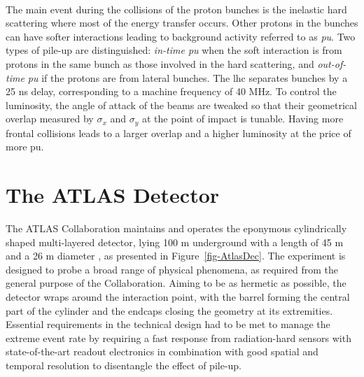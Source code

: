 \paragraph{}The main event during the collisions of the proton bunches is the inelastic hard scattering where most of the energy transfer occurs. Other protons in the bunches can have softer interactions leading to background activity referred to as \textit{\gls{pu}}. Two types of pile-up are distinguished: \textit{in-time \gls{pu}} when the soft interaction is from protons in the same bunch as those involved in the hard scattering, and \textit{out-of-time \gls{pu}} if the protons are from lateral bunches. The \gls{lhc} separates bunches by a 25 ns delay, corresponding to a machine frequency of 40 MHz. To control the luminosity, the angle of attack of the beams are tweaked so that their geometrical overlap measured by $\sigma_x$ and $\sigma_y$ at the point of impact is tunable. Having more frontal collisions leads to a larger overlap and a higher luminosity at the price of more \gls{pu}. 

\section{The ATLAS Detector}\label{sec-ATLASDet}
The ATLAS Collaboration maintains and operates the eponymous cylindrically shaped multi-layered detector, lying 100 m underground with a length of 45 m and a 26 m diameter \cite{TheATLASCollaboration_2008}, as presented in Figure~\ref{fig-AtlasDec}. The experiment is designed to probe a broad range of physical phenomena, as required from the general purpose of the Collaboration. Aiming to be as hermetic as possible, the detector wraps around the interaction point, with the barrel forming the central part of the cylinder and the endcaps closing the geometry at its extremities. Essential requirements in the technical design had to be met to manage the extreme event rate by requiring a fast response from radiation-hard sensors with state-of-the-art readout electronics in combination with good spatial and temporal resolution to disentangle the effect of pile-up. 

